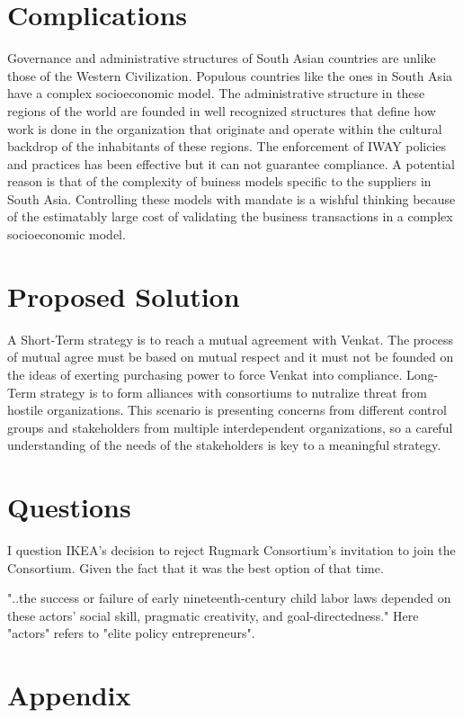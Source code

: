 \documentclass[11pt, a4paper, margin=1in]{IEEEtran}
\begin{document}
\section{Complications}
Governance and administrative structures of South Asian countries are unlike those of the Western Civilization. Populous countries like the ones in South Asia have a complex socioeconomic model. The administrative structure in these regions of the world are founded in well recognized structures that define how work is done in the organization that originate and operate within the cultural backdrop of the inhabitants of these regions.
The enforcement of IWAY policies and practices has been effective but it can not guarantee compliance. A potential reason is that of the complexity of buiness models specific to the suppliers in South Asia. Controlling these models with mandate is a wishful thinking because of the estimatably large cost of validating the business transactions in a complex socioeconomic model.

\section{Proposed Solution}
A Short-Term strategy is to reach a mutual agreement with Venkat. The process of mutual agree must be based on mutual respect and it must not be founded on the ideas of exerting purchasing power to force Venkat into compliance. Long-Term strategy is to form alliances with consortiums to nutralize threat from hostile organizations. This scenario is presenting concerns from different control groups and stakeholders from multiple interdependent organizations, so a careful understanding of the needs of the stakeholders is key to a meaningful strategy.

\section{Questions}
I question IKEA's decision to reject Rugmark Consortium's invitation to join the Consortium. Given the fact that it was the best option of that time. \cite{publichearing1998}

"..the success or failure of early nineteenth-century child labor laws depended on these actors’ social skill, pragmatic creativity, and goal-directedness." \cite{anderson2018policy} Here "actors" refers to "elite policy entrepreneurs".

\newpage

\section{Appendix}
\end{document}
